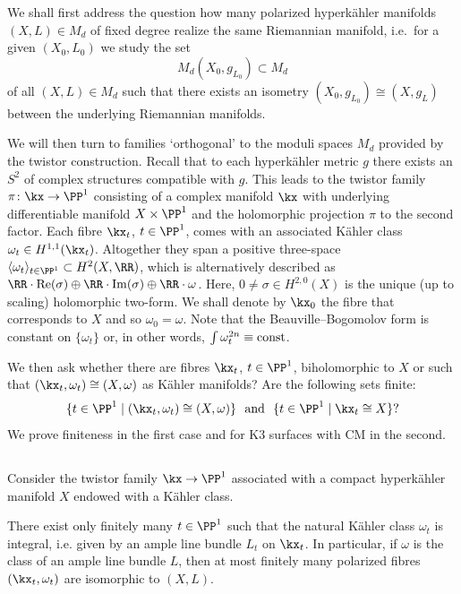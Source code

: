 We shall first address the question how many polarized hyperk\"ahler manifolds $(X,L)\in M_d$ of fixed degree realize the same Riemannian manifold, i.e.\
for a given $(X_0,L_0)$ we study the set
\[
M_d(X_0,g_{L_0})\subset M_d
\]
of all
$(X,L)\in M_d$ such that there exists an isometry $(X_0,g_{L_0})\cong (X,g_L)$ between the underlying Riemannian manifolds.

We will then turn to families `orthogonal' to the moduli spaces $M_d$ provided by the twistor construction. Recall that to each hyperk\"ahler metric $g$ there exists an $S^2$ of complex structures compatible with $g$. This leads to the twistor family $\pi\colon\kx\to\PP^1$ consisting of a complex manifold $\kx$ with underlying differentiable manifold $X\times \PP^1$ and the holomorphic projection $\pi$ to the second factor. Each fibre $\kx_t$, $t\in\PP^1$, comes with an associated K\"ahler class $\omega_t\in H^{1,1}(\kx_t)$. Altogether they span a positive three-space $\langle\omega_t\rangle_{t\in\PP^1}\subset H^2(X,\RR)$, which is alternatively described as $\RR\cdot{\rm Re}(\sigma)\oplus\RR\cdot{\rm Im}(\sigma)\oplus\RR\cdot\omega$. Here, $0\ne\sigma\in H^{2,0}(X)$ is the unique (up to scaling) holomorphic two-form. We shall denote by $\kx_0$ the fibre that corresponds to $X$ and so $\omega_0=\omega$. Note that the Beauville--Bogomolov form is constant on $\{\omega_t\}$ or, in other words, $\int\omega_t^{2n}\equiv{\rm const}$.

We then ask whether there are fibres $\kx_t$, $t\in\PP^1$, biholomorphic to $X$ or such that $(\kx_{t},\omega_{t})\cong(X,\omega)$ as K\"ahler manifolds? Are the following sets finite:
\[
\{t\in\PP^1\mid (\kx_t,\omega_t)\cong (X,\omega)\}\text{~~and~~} \{t\in\PP^1\mid \kx_t\cong X\}?
\]
We prove finiteness in
the first case and for K3 surfaces with CM in the second.

\subsection{}
Consider the twistor family $\kx\to\PP^1$ associated with a compact hyperk\"ahler manifold $X$ endowed with a K\"ahler class.

\begin{lemm}\label{lem:key}
There exist only finitely many $t\in \PP^1$ such that
the natural K\"ahler class $\omega_t$ is integral, i.e. given by an ample line bundle $L_t$ on $\kx_t$. In particular, if $\omega$ is the class of an ample line bundle $L$, then at most finitely many polarized fibres $(\kx_t,\omega_t)$ are isomorphic to $(X,L)$.
\end{lemm}

